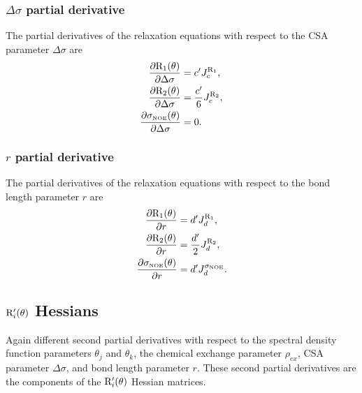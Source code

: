 \subsubsection{$\Delta\sigma$ partial derivative}

The partial derivatives of the relaxation equations with respect to the CSA parameter $\Delta\sigma$ are
\begin{subequations}
\begin{align}
    \frac{\partial \mathrm{R}_1(\theta)}{\partial \Delta\sigma} &= c' J_c^{\mathrm{R}_1},             \label{eq: Ri': dR1/dCSA} \\
    \frac{\partial \mathrm{R}_2(\theta)}{\partial \Delta\sigma} &= \frac{c'}{6} J_c^{\mathrm{R}_2},   \label{eq: Ri': dR2/dCSA} \\
    \frac{\partial \sigma_{\scriptscriptstyle \mathrm{NOE}}(\theta)}{\partial \Delta\sigma} &= 0.                 \label{eq: Ri': dsigmaNOE/dCSA}
\end{align}
\end{subequations}


\subsubsection{$r$ partial derivative}

The partial derivatives of the relaxation equations with respect to the bond length parameter $r$ are
\begin{subequations}
\begin{align}
    \frac{\partial \mathrm{R}_1(\theta)}{\partial r} &= d' J_d^{\mathrm{R}_1},                \label{eq: Ri': dR1/dr} \\
    \frac{\partial \mathrm{R}_2(\theta)}{\partial r} &= \frac{d'}{2} J_d^{\mathrm{R}_2},      \label{eq: Ri': dR2/dr} \\
    \frac{\partial \sigma_{\scriptscriptstyle \mathrm{NOE}}(\theta)}{\partial r} &= d' J_d^{\sigma_{\scriptscriptstyle \mathrm{NOE}}}.  \label{eq: Ri': dsigmaNOE/dr}
\end{align}
\end{subequations}




\subsection{$\mathrm{R}_i'(\theta)$ Hessians}

Again different second partial derivatives with respect to the spectral density function parameters $\theta_j$ and $\theta_k$, the chemical exchange parameter $\rho_{ex}$, CSA parameter $\Delta\sigma$, and bond length parameter $r$.  These second partial derivatives are the components of the $\mathrm{R}_i'(\theta)$ Hessian matrices.


